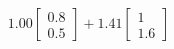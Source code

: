 \documentclass[preview]{standalone}
\begin{document}
\begin{align*}
1.00 \begin{bmatrix} 0.8 \\ 0.5 \end{bmatrix} + 1.41 \begin{bmatrix} 1 \\ 1.6 \end{bmatrix}
\end{align*}
\end{document}
